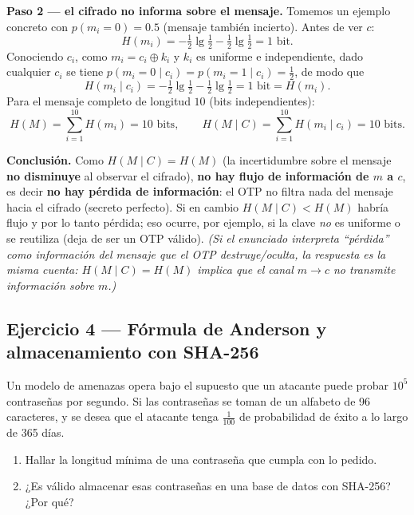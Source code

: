 \medskip
\textbf{Paso 2 — el cifrado no informa sobre el mensaje.} Tomemos un ejemplo concreto con
$p(m_i{=}0)=0.5$ (mensaje también incierto). Antes de ver $c$:
\begin{equation*}
  H(m_i) = -\tfrac12\lg\tfrac12 - \tfrac12\lg\tfrac12 = 1 \text{ bit}.
\end{equation*}
Conociendo $c_i$, como $m_i = c_i \oplus k_i$ y $k_i$ es uniforme e independiente, dado
cualquier $c_i$ se tiene $p(m_i{=}0\mid c_i)=p(m_i{=}1\mid c_i)=\tfrac12$, de modo que
\begin{equation*}
  H(m_i \mid c_i) = -\tfrac12\lg\tfrac12 - \tfrac12\lg\tfrac12 = 1 \text{ bit} = H(m_i).
\end{equation*}
Para el mensaje completo de longitud $10$ (bits independientes):
\begin{equation*}
  H(M) = \sum_{i=1}^{10} H(m_i) = 10 \text{ bits}, \qquad
  H(M \mid C) = \sum_{i=1}^{10} H(m_i \mid c_i) = 10 \text{ bits}.
\end{equation*}

\medskip
\textbf{Conclusión.} Como $H(M\mid C) = H(M)$ (la incertidumbre sobre el mensaje
\textbf{no disminuye} al observar el cifrado), \textbf{no hay flujo de información de $m$ a
$c$}, es decir \textbf{no hay pérdida de información}: el OTP no filtra nada del mensaje hacia
el cifrado (secreto perfecto). Si en cambio $H(M\mid C) < H(M)$ habría flujo y por lo tanto
pérdida; eso ocurre, por ejemplo, si la clave \emph{no} es uniforme o se reutiliza (deja de
ser un OTP válido). \emph{(Si el enunciado interpreta ``pérdida'' como información del mensaje
que el OTP destruye/oculta, la respuesta es la misma cuenta: $H(M\mid C)=H(M)$ implica que el
canal $m\to c$ no transmite información sobre $m$.)}

\subsection{Ejercicio 4 — Fórmula de Anderson y almacenamiento con SHA-256}

\begin{consigna}
Un modelo de amenazas opera bajo el supuesto que un atacante puede probar $10^5$ contraseñas
por segundo. Si las contraseñas se toman de un alfabeto de 96 caracteres, y se desea que el
atacante tenga $\tfrac{1}{100}$ de probabilidad de éxito a lo largo de 365 días.
\begin{enumerate}
  \item[a)] Hallar la longitud mínima de una contraseña que cumpla con lo pedido.
  \item[b)] ¿Es válido almacenar esas contraseñas en una base de datos con SHA-256? ¿Por qué?
\end{enumerate}
\end{consigna}

